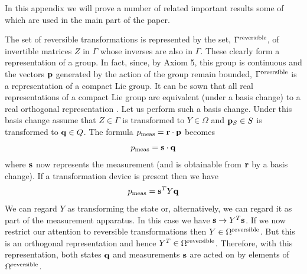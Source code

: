 \documentclass[10pt,twocolumn]{article}
\begin{document}
\vspace{6mm}


\vspace{6mm}

In this appendix we will prove a number of related important results
some of which are used in the main part of the paper.

The set of reversible transformations is represented by the set,
$\Gamma^{\rm reversible}$, of invertible matrices $Z$ in $\Gamma$ whose
inverses are also in $\Gamma$.  These
clearly form a representation of a group.  In fact, since, by Axiom 5,
this group is
continuous and the vectors ${\bf p}$ generated by the action of
the group remain bounded, $\Gamma^{\rm reversible}$ is a representation
of a compact Lie group.   It can be sown that all real representations
of a compact Lie group are equivalent (under a basis change) to a real
orthogonal representation \cite{boerner}.  Let us perform such a basis
change. Under this basis change assume that $Z\in\Gamma$ is transformed
to $Y\in \Omega$ and ${\bf p}_S \in S$ is transformed to ${\bf q}\in Q$.
The formula $p_{\rm meas}={\bf r}\cdot {\bf p}$ becomes
\begin{equation}
p_{\rm meas}= {\bf s}\cdot {\bf q}
\end{equation}
where ${\bf s}$ now represents the measurement (and is obtainable from
${\bf r}$ by a basis change).  If a transformation device is present
then we have
\begin{equation}
p_{\rm meas}= {\bf s}^T  Y {\bf q}
\end{equation}
We can regard $Y$ as transforming the state or, alternatively, we can
regard it as part of the measurement apparatus.  In this case we have
${\bf s}\rightarrow Y^T{\bf s}$.  If we now restrict our attention to
reversible transformations then $Y\in \Omega^{\rm reversible}$.  But
this is an orthogonal representation and hence $Y^T \in
\Omega^{\rm reversible}$.  Therefore, with this representation, both
states ${\bf q}$ and measurements ${\bf s}$ are acted on by elements of
$\Omega^{\rm reversible}$.

\vspace{4mm}


\vspace{4mm}
\end{document}

